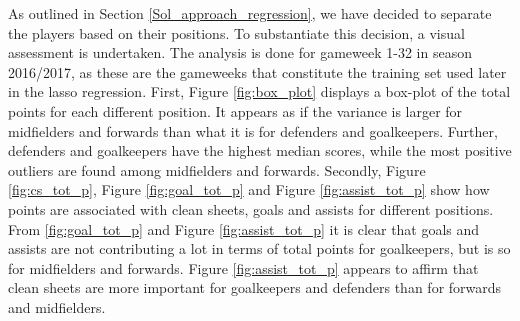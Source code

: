 As outlined in Section \ref{Sol_approach_regression}, we have decided to separate the players based on their positions. To substantiate this decision, a visual assessment is undertaken. The analysis is done for gameweek 1-32 in season 2016/2017, as these are the gameweeks that constitute the training set used later in the lasso regression. First, Figure \ref{fig:box_plot} displays a box-plot of the total points for each different position. It appears as if the variance is larger for midfielders and forwards than what it is for defenders and goalkeepers. Further, defenders and goalkeepers have the highest median scores, while the most positive outliers are found among midfielders and forwards. Secondly, Figure \ref{fig:cs_tot_p}, Figure \ref{fig:goal_tot_p} and Figure \ref{fig:assist_tot_p} show how points are associated with clean sheets, goals and assists for different positions. From \ref{fig:goal_tot_p} and Figure \ref{fig:assist_tot_p} it is clear that goals and assists are not contributing a lot in terms of total points for goalkeepers, but is so for midfielders and forwards. Figure \ref{fig:assist_tot_p} appears to affirm that clean sheets are more important for goalkeepers and defenders than for forwards and midfielders.

